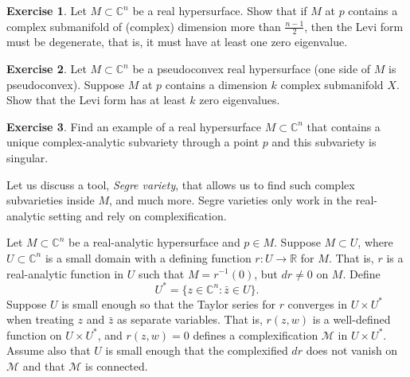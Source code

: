 \documentclass[12pt,openany]{book}
\newcommand{\C}{{\mathbb{C}}}
\newcommand{\R}{{\mathbb{R}}}
\newcommand{\sM}{{\mathscr{M}}}
\newcommand{\myindex}[1]{#1\index{#1}}
\theoremstyle{plain}
\theoremstyle{remark}
\theoremstyle{definition}
\newenvironment{exbox}{%
    \def\FrameCommand{\vrule width 1pt \relax\hspace {10pt}}%
    \MakeFramed {\advance \hsize -\width \FrameRestore }%
}{%
    \endMakeFramed
}
\theoremstyle{exercise}
\newtheorem{exercise}{Exercise}[section]
\theoremstyle{example}
\begin{document}
\begin{exbox}
\begin{exercise}
Let $M \subset \C^n$ be a real hypersurface.
Show that if $M$ at $p$ contains a complex submanifold of (complex)
dimension more than
$\frac{n-1}{2}$, then the Levi form must be degenerate, that is, it must
have at least one zero eigenvalue.
\end{exercise}

\begin{exercise}
Let $M \subset \C^n$ be a pseudoconvex real hypersurface
(one side of $M$ is pseudoconvex).
Suppose $M$ at $p$ contains a dimension $k$ complex submanifold $X$.
Show that the Levi form has at least $k$ zero eigenvalues.
\end{exercise}

\begin{exercise}
Find an example of a real hypersurface $M \subset \C^n$ that contains a unique
complex-analytic subvariety through a point $p$ and this subvariety is singular.
\end{exercise}
\end{exbox}


Let us discuss a tool, \emph{\myindex{Segre variety}}, that allows us to
find such complex subvarieties inside $M$, and much more.  Segre varieties only
work in the real-analytic setting and rely on complexification.

Let $M \subset \C^n$ be a real-analytic hypersurface and $p \in M$.
Suppose $M \subset U$,
where $U \subset \C^n$ is a small domain with a defining function $r \colon
U  \to \R$ for $M$.  That is, $r$ is a real-analytic function in $U$ such that
$M = r^{-1}(0)$, but
$dr \not= 0$ on $M$.  Define
\begin{equation*}
U^* = \bigl\{ z \in \C^n : \bar{z} \in U \bigr\} .
\end{equation*}
Suppose $U$ is small enough so that the Taylor series for $r$
converges in $U \times U^*$ when treating $z$ and $\bar{z}$ as separate
variables.  That is, $r(z,w)$ is a well-defined function on
$U \times U^*$, and $r(z,w) = 0$ defines a complexification $\sM$
in $U \times U^*$.  Assume also that $U$ is small enough that
the complexified
$dr$ does not vanish on $\sM$ and that $\sM$ is connected.
\end{document}
